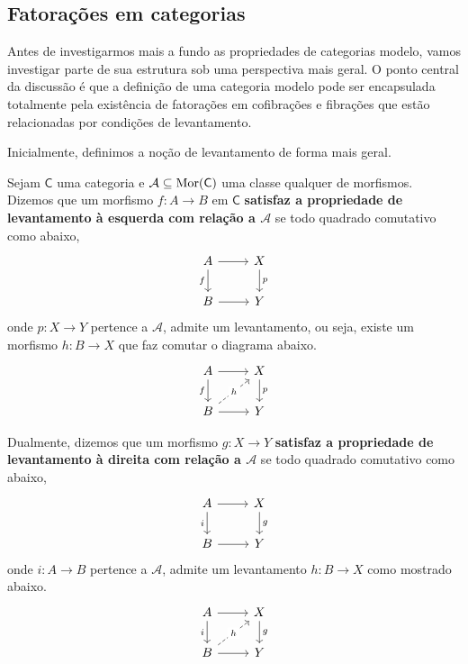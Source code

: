 \subsection{Fatorações em categorias}

Antes de investigarmos mais a fundo as propriedades de categorias modelo, vamos investigar parte de sua estrutura sob uma perspectiva mais geral.
O ponto central da discussão é que a definição de uma categoria modelo pode ser encapsulada totalmente pela existência de fatorações em cofibrações e fibrações que estão relacionadas por condições de levantamento.

Inicialmente, definimos a noção de levantamento de forma mais geral.

\begin{defin}
  Sejam $\mathsf{C}$ uma categoria e $\mathcal{A} \subseteq \mathrm{Mor}(\mathsf{C})$ uma classe qualquer de morfismos.
  Dizemos que um morfismo $f: A \to B$ em $\mathsf{C}$ \textbf{satisfaz a propriedade de levantamento à esquerda com relação a $\mathcal{A}$} se todo quadrado comutativo como abaixo,
  \begin{displaymath}
    \begin{tikzcd}
      A
      \arrow[r]
      \arrow[d, "f" swap]
      & X
      \arrow[d, "p"]
      \\ B
      \arrow[r]
      & Y
    \end{tikzcd}
  \end{displaymath}
  onde $p: X \to Y$ pertence a $\mathcal{A}$, admite um levantamento, ou seja, existe um morfismo $h: B \to X$ que faz comutar o diagrama abaixo.
  \begin{displaymath}
    \begin{tikzcd}
      A
      \arrow[r]
      \arrow[d, "f" swap]
      & X
      \arrow[d, "p"]
      \\ B
      \arrow[r]
      \arrow[ru, dashed, "h" description]
      & Y
    \end{tikzcd}
  \end{displaymath}

  Dualmente, dizemos que um morfismo $g: X \to Y$ \textbf{satisfaz a propriedade de levantamento à direita com relação a $\mathcal{A}$} se todo quadrado comutativo como abaixo,
  \begin{displaymath}
    \begin{tikzcd}
      A
      \arrow[d, "i" swap]
      \arrow[r]
      & X
      \arrow[d, "g"]
      \\ B
      \arrow[r]
      & Y
    \end{tikzcd}
  \end{displaymath}
  onde $i: A \to B$ pertence a $\mathcal{A}$, admite um levantamento $h: B \to X$ como mostrado abaixo.
  \begin{displaymath}
    \begin{tikzcd}
      A
      \arrow[r]
      \arrow[d, "i" swap]
      & X
      \arrow[d, "g"]
      \\ B
      \arrow[r]
      \arrow[ru, dashed, "h" description]
      & Y
    \end{tikzcd}
  \end{displaymath}
\end{defin}



